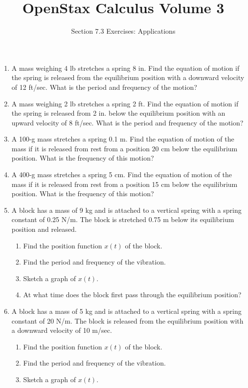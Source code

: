 \documentclass{exercises}
\title{OpenStax Calculus Volume 3}
\subtitle{Section 7.3 Exercises: Applications}
\author{}
\date{}
\begin{document}
\maketitle

\begin{enumerate}[start=1]
\item A mass weighing 4 lb stretches a spring 8 in. Find the equation of motion if the spring is released from the equilibrium position with a downward velocity of 12 ft/sec. What is the period and frequency of the motion?
\item A mass weighing 2 lb stretches a spring 2 ft. Find the equation of motion if the spring is released from 2 in. below the equilibrium position with an upward velocity of 8 ft/sec. What is the period and frequency of the motion?
\item A 100-g mass stretches a spring 0.1 m. Find the equation of motion of the mass if it is released from rest from a position 20 cm below the equilibrium position. What is the frequency of this motion?
\item A 400-g mass stretches a spring 5 cm. Find the equation of motion of the mass if it is released from rest from a position 15 cm below the equilibrium position. What is the frequency of this motion?
\item A block has a mass of 9 kg and is attached to a vertical spring with a spring constant of 0.25 N/m. The block is stretched 0.75 m below its equilibrium position and released.
\begin{enumerate}[label=(\alph*)]
  \item Find the position function $x(t)$ of the block.
  \item Find the period and frequency of the vibration.
  \item Sketch a graph of $x(t)$.
  \item At what time does the block first pass through the equilibrium position?
\end{enumerate}
\item A block has a mass of 5 kg and is attached to a vertical spring with a spring constant of 20 N/m. The block is released from the equilibrium position with a downward velocity of 10 m/sec.
\begin{enumerate}[label=(\alph*)]
  \item Find the position function $x(t)$ of the block.
  \item Find the period and frequency of the vibration.
  \item Sketch a graph of $x(t)$.

\end{enumerate}
\end{enumerate}
\end{document}
